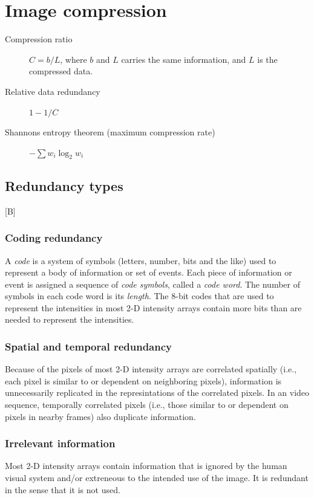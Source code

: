\documentclass[12pt]{article}
\begin{document}
\section{Image compression}
	\begin{description}
	    \item[Compression ratio] $C = b/L$, where $b$ and $L$ carries the same information, and
	    $L$ is the compressed data.
	    \item[Relative data redundancy] $1 - 1/C$
	    \item[Shannons entropy theorem (maximum compression rate)] $-\sum w_i \log_2 w_i$
    \end{description}
    \subsection{Redundancy types}
    [B]
        \subsubsection{Coding redundancy}
            A \emph{code} is a system of symbols (letters, number, bits and the like) used to
            represent a body of information or set of events. Each piece of information or 
            event is assigned a sequence of \emph{code symbols}, called a \emph{code word}.
            The number of symbols in each code word is its \emph{length}. The 8-bit codes that 
            are used to represent the intensities in most 2-D intensity arrays contain more
            bits than are needed to represent the intensities.
        \subsubsection{Spatial and temporal redundancy} 
            Because of the pixels of most 2-D intensity arrays are correlated spatially (i.e.,
            each pixel is similar to or dependent on neighboring pixels), information is
            unnecessarily replicated in the represintations of the correlated pixels. In an
            video sequence, temporally correlated pixels (i.e., those similar to or dependent
            on pixels in nearby frames) also duplicate information.
        \subsubsection{Irrelevant information} 
            Most 2-D intensity arrays contain information that is ignored by the human visual
            system and/or extreneous to the intended use of the image. It is redundant in the
            sense that it is not used.
\end{document}
